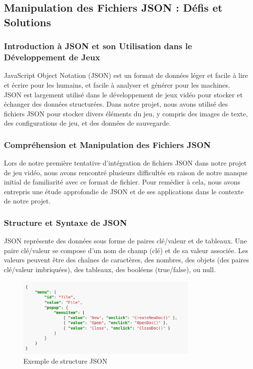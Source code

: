 \subsection{Manipulation des Fichiers JSON : Défis et Solutions}

\subsubsection{Introduction à JSON et son Utilisation dans le Développement de Jeux}

JavaScript Object Notation (JSON) est un format de données léger et facile à lire et écrire pour les humains, et facile à analyser et générer pour les machines.
JSON est largement utilisé dans le développement de jeux vidéo pour stocker et échanger des données structurées. Dans notre projet, nous avons utilisé des fichiers
JSON pour stocker divers éléments du jeu, y compris des images de texte, des configurations de jeu, et des données de sauvegarde.

\subsubsection{Compréhension et Manipulation des Fichiers JSON}

Lors de notre première tentative d'intégration de fichiers JSON dans notre projet de jeu vidéo, nous avons rencontré plusieurs difficultés en raison de notre manque initial de familiarité avec ce format de fichier.
Pour remédier à cela, nous avons entrepris une étude approfondie de JSON et de ses applications dans le contexte de notre projet.

\subsubsection{Structure et Syntaxe de JSON}

JSON représente des données sous forme de paires clé/valeur et de tableaux. Une paire clé/valeur se compose d'un nom de champ (clé) et de sa valeur associée.
Les valeurs peuvent être des chaînes de caractères, des nombres, des objets (des paires clé/valeur imbriquées), des tableaux, des booléens (true/false), ou null.
\\

\begin{figure}[H]
      \centering
      \includegraphics[width=0.8\textwidth]{assets/jsonexemple.png}
      \caption{Exemple de structure JSON}
      \label{fig:json}
\end{figure}

